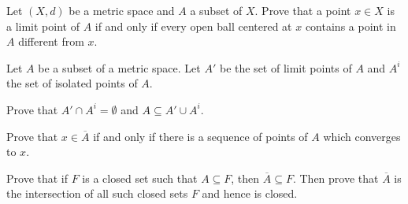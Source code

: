 \begin{comment}
For the reverse containment, let $x \in X \setminus \overline{A}$. To show that $x \in \Int(X \setminus A)$ we will show that there is an open ball centered at $x$ that is a subset of $X \setminus A$. So $x \notin A$. Now $x \notin \overline{A}$, so $x \notin A'$. This means that there is an open ball $B$ centered at $x$ that contains no points of $A$ different from $x$. Since $x \notin A$, the open ball $B$ contains no points of $A$. Thus, $B \subseteq X \setminus A$ and $x \in \Int(X \setminus A)$. Thus, $X \setminus \overline{A} \subseteq \Int(X \setminus A)$ and the two containments show that $\Int(X \setminus A) = X \setminus \overline{A}$.

\ea

\end{comment}

\item Let $(X,d)$ be a metric space and $A$ a subset of $X$. Prove that a point $x \in X$ is a limit point of $A$ if and only if every open ball centered at $x$ contains a point in $A$ different from $x$.

\begin{comment}

\ExerciseSolution Suppose that $x$ is a limit point of $A$. Let $r>0$. Since $B(x,r)$ is a neighborhood of $x$, the definition of limit point tells us that $B(x,r)$ contains a point in $A$ different from $x$. So every open ball centered at $x$ contains a point in $A$ different from $x$.

Now assume that every open ball centered at $x$ contains a point in $A$ different from $x$. Let $N$ be a neighborhood of $x$. Then $B(x,r) \subseteq N$ for some $r > 0$. By hypothesis, this open ball contains a point in $A$ different from $x$, and that point is also in $N$. Thus, every neighborhood of $x$ contains a point in $A$ different from $x$ and $x$ is a limit point of $A$.  


\end{comment}

\item Let $A$ be a subset of a metric space. Let $A'$ be the set of limit points of $A$ and $A^i$ the set of isolated points of $A$. 
\ba
\item Prove that $A' \cap A^i = \emptyset$ and $A \subseteq A' \cup A^i$. 
\item Prove that $x \in \overline{A}$ if and only if there is a sequence of points of $A$ which converges to $x$. 
\item Prove that if $F$ is a closed set such that $A \subseteq F$, then $\overline{A} \subseteq F$. Then prove that $\overline{A}$ is the intersection of all such closed sets $F$ and hence is closed.
\ea

